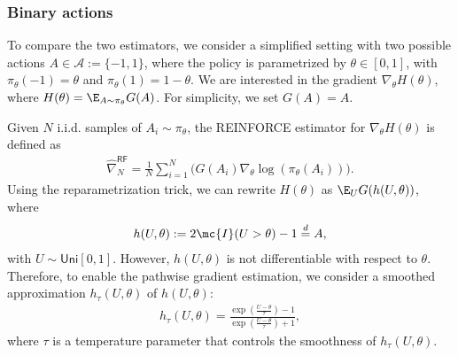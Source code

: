  \subsubsection{Binary actions}
\label{sec:theory_gradient_estimation_binary}


To compare the two estimators, we consider a simplified setting with two possible actions 
$A \in \mathcal{A} := \{-1,1\}$, where the policy is parametrized by
$\theta \in [0,1]$, with
$\pi_\theta(-1) = \theta$ and $\pi_\theta(1) =1-\theta$. We are interested in the gradient $\nabla_\theta H(\theta)$, where $H(\theta) =\E_{A\sim \pi_\theta}G(A)$. For simplicity, we set $G(A)=A$.

\noindent Given $N$ i.i.d. samples of $A_i \sim \pi_\theta$, the \textsf{REINFORCE} estimator for $\nabla_\theta H(\theta)$ is defined as
\begin{align}
    \hat{\nabla}^{\mathsf{RF}}_N = \frac{1}{N}\sum_{i=1}^N\Big(G(A_i) \nabla_\theta \log(\pi_\theta(A_i)) \Big).
    \label{eqn:bin-reinf-def}
\end{align}
Using  the reparametrization trick, we can rewrite  $H(\theta)$ as $\E_U G(h(U,\theta))$, where 
\begin{align*}
    h(U,\theta):= 2\mc{I}(U > \theta)-1\stackrel{d}{=}A,
\end{align*}
with $U\sim \mathsf{Uni}[0,1]$. However, $h(U,\theta)$ is not differentiable with respect to $\theta$. Therefore, to enable the pathwise gradient estimation, we consider a smoothed approximation $ h_\tau(U,\theta)$ of $ h(U,\theta)$:
\begin{align*}
    h_{\tau}(U,\theta) = \frac{\exp\left(\frac{U-\theta}{\tau}\right)-1}{\exp\left(\frac{U-\theta}{\tau}\right)+1},
\end{align*}
where $\tau$ is a temperature parameter that controls the smoothness of $h_\tau(U,\theta)$.

